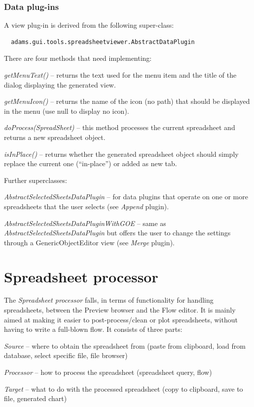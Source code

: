 \documentclass[a4paper]{book}
\begin{document}
\subsubsection{Data plug-ins}
A view plug-in is derived from the following super-class:
\begin{verbatim}
  adams.gui.tools.spreadsheetviewer.AbstractDataPlugin
\end{verbatim}
There are four methods that need implementing:
\begin{tight_itemize}
	\item \textit{getMenuText()} -- returns the text used for the menu item 
	and the title of the dialog displaying the generated view.
	\item \textit{getMenuIcon()} -- returns the name of the icon (no path)
	that should be displayed in the menu (use null to display no icon). 
	\item \textit{doProcess(SpreadSheet)} -- this method processes the
	current spreadsheet and returns a new spreadsheet object.
	\item \textit{isInPlace()} -- returns whether the generated spreadsheet
	object should simply replace the current one (``in-place'') or added as
	new tab.
\end{tight_itemize}
Further superclasses:
\begin{tight_itemize}
	\item \textit{AbstractSelectedSheetsDataPlugin} -- for data plugins that
	operate on one or more spreadsheets that the user selects (see 
	\textit{Append} plugin).
	\item \textit{AbstractSelectedSheetsDataPluginWithGOE} -- same as
	\textit{AbstractSelectedSheetsDataPlugin} but offers the user to change
	the settings through a GenericObjectEditor view (see \textit{Merge} plugin).
\end{tight_itemize}


\clearpage
\section{Spreadsheet processor}
The \textit{Spreadsheet processor} falls, in terms of functionality for handling
spreadsheets, between the Preview browser and the Flow editor. It is mainly aimed
at making it easier to post-process/clean or plot spreadsheets, without having
to write a full-blown flow. It consists of three parts:
\begin{tight_itemize}
  \item \textit{Source} -- where to obtain the spreadsheet from (paste from clipboard,
  load from database, select specific file, file browser)
  \item \textit{Processor} -- how to process the spreadsheet (spreadsheet query, flow)
  \item \textit{Target} -- what to do with the processed spreadsheet (copy to clipboard,
  save to file, generated chart)
\end{tight_itemize}
\end{document}
